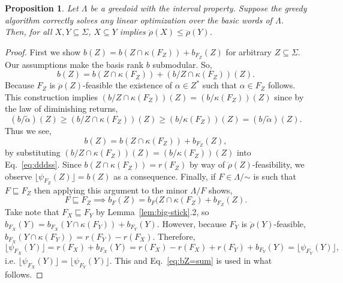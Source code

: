 \documentclass[11pt]{article}
\newtheorem{proposition}[theorem]{Proposition}
\newcommand{\univ}{\Sigma}
\newcommand{\glang}{\Lambda}
\newcommand{\greedyrep}{\ddot{\rho}}
\begin{document}
\begin{proposition}\label{prop:gr-monotonicity}
    Let $\glang$ be a greedoid with the interval property.
    Suppose the greedy algorithm correctly solves any linear optimization over the basic words of $\glang$.
    Then, for all $X,Y\subseteq\univ$, $X\subseteq Y$ implies $\greedyrep(X) \leq \greedyrep(Y)$.
\end{proposition}
\begin{proof}
    First we show $b(Z) = b(Z\cap \kappa({F_Z})) + b_{F_Z}(Z)$ for arbitrary $Z\subseteq\univ$.
    Our assumptions make the basis rank $b$ submodular.
    So,
    \begin{equation}\label{eq:dddss}
        b(Z) = b(Z \cap \kappa({F_Z})) + (b/Z \cap \kappa({F_Z}))(Z).
    \end{equation}
    Because ${F_Z}$ is $\greedyrep(Z)$-feasible the existence of $\alpha \in Z^*$ such that $\alpha \in {F_Z}$ follows.
    This construction implies $(b/Z \cap \kappa({F_Z}))(Z) = (b/\kappa({F_Z}))(Z)$ since by the law of diminishing returns,
    \[
        (b/\widetilde{\alpha})(Z) \geq (b/Z \cap \kappa({F_Z}))(Z) \geq (b/\kappa({F_Z}))(Z) = (b/\widetilde{\alpha})(Z).
    \]
    Thus we see,
    \begin{equation}\label{eq:bZ=sum}
        b(Z) = b(Z\cap \kappa({F_Z})) + b_{F_Z}(Z),
    \end{equation}
    by substituting $(b/Z \cap \kappa({F_Z}))(Z) = (b/\kappa({F_Z}))(Z)$ into Eq.~\ref{eq:dddss}.
    Since $b(Z\cap\kappa(F_Z)) = r(F_Z)$ by way of $\greedyrep(Z)$-feasibility, we observe $\lfloor \psi_{F_Z}(Z)\rfloor = b(Z)$ as a consequence.
    Finally, if $F \in \glang/\mathord{\sim}$ is such that $F\sqsubseteq F_Z$ then applying this argument to the minor $\glang/F$ shows,
    \[
        F\sqsubseteq F_Z \implies b_F(Z) = b_F(Z\cap\kappa({F_Z}) + b_{F_Z}(Z).
    \]
    Take note that $F_X \sqsubseteq F_Y$ by Lemma~\ref{lem:big-stick}.2, so $b_{F_X}(Y) = b_{F_X}(Y\cap\kappa(F_Y)) + b_{F_Y}(Y)$.
    However, because $F_Y$ is $\greedyrep(Y)$-feasible, $b_{F_X}(Y\cap\kappa(F_Y)) = r(F_Y) - r(F_X)$.
    Therefore,
    \begin{equation}\label{eq:ifyfzf}
        \lfloor \psi_{F_X}(Y)\rfloor = r(F_X) + b_{F_X}(Y) = r(F_X) - r(F_X) + r(F_Y) + b_{F_Y}(Y) = \lfloor \psi_{F_Y}(Y) \rfloor,
    \end{equation}
    i.e. $\lfloor \psi_{F_X}(Y)\rfloor = \lfloor \psi_{F_Y}(Y) \rfloor$.
    This and Eq.~\ref{eq:bZ=sum} is used in what follows.


\end{proof}
\end{document}
